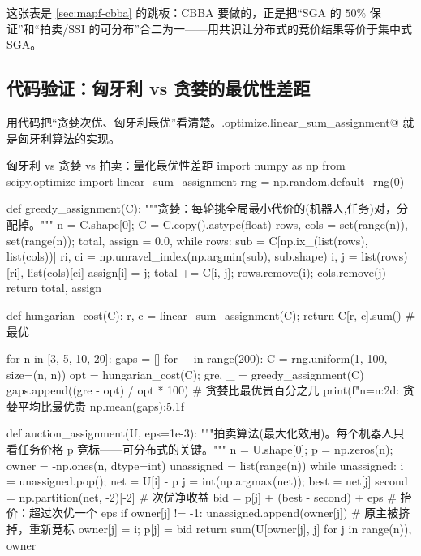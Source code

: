 这张表是 \cref{sec:mapf-cbba} 的跳板：CBBA 要做的，正是把“SGA 的 $50\%$ 保证”和“拍卖/SSI 的可分布”合二为一——用共识让分布式的竞价结果等价于集中式 SGA。

\subsection{代码验证：匈牙利 vs 贪婪的最优性差距}
\label{sec:mapf-assign-code}

用代码把“贪婪次优、匈牙利最优”看清楚。\verb@scipy.optimize.linear_sum_assignment@ 就是匈牙利算法的实现。

\begin{codebox}[Python]{匈牙利 vs 贪婪 vs 拍卖：量化最优性差距}
import numpy as np
from scipy.optimize import linear_sum_assignment
rng = np.random.default_rng(0)

def greedy_assignment(C):
    """贪婪：每轮挑全局最小代价的(机器人,任务)对，分配掉。"""
    n = C.shape[0]; C = C.copy().astype(float)
    rows, cols = set(range(n)), set(range(n)); total, assign = 0.0, {}
    while rows:
        sub = C[np.ix_(list(rows), list(cols))]
        ri, ci = np.unravel_index(np.argmin(sub), sub.shape)
        i, j = list(rows)[ri], list(cols)[ci]
        assign[i] = j; total += C[i, j]; rows.remove(i); cols.remove(j)
    return total, assign

def hungarian_cost(C):
    r, c = linear_sum_assignment(C); return C[r, c].sum()     # 最优

for n in [3, 5, 10, 20]:
    gaps = []
    for _ in range(200):
        C = rng.uniform(1, 100, size=(n, n))
        opt = hungarian_cost(C); gre, _ = greedy_assignment(C)
        gaps.append((gre - opt) / opt * 100)                  # 贪婪比最优贵百分之几
    print(f"n={n:2d}: 贪婪平均比最优贵 {np.mean(gaps):5.1f}%

def auction_assignment(U, eps=1e-3):
    """拍卖算法(最大化效用)。每个机器人只看任务价格 p 竞标——可分布式的关键。"""
    n = U.shape[0]; p = np.zeros(n); owner = -np.ones(n, dtype=int)
    unassigned = list(range(n))
    while unassigned:
        i = unassigned.pop(); net = U[i] - p
        j = int(np.argmax(net)); best = net[j]
        second = np.partition(net, -2)[-2]                    # 次优净收益
        bid = p[j] + (best - second) + eps                    # 抬价：超过次优一个 eps
        if owner[j] != -1: unassigned.append(owner[j])        # 原主被挤掉，重新竞标
        owner[j] = i; p[j] = bid
    return sum(U[owner[j], j] for j in range(n)), owner
\end{codebox}

